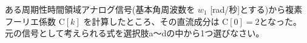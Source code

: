 ある周期性時間領域アナログ信号(基本角周波数を $w_1$ [rad/秒]とする)から複素フーリエ係数 $\textrm{C}[k]$ を計算したところ、その直流成分は $\textrm{C}[0] = 2$となった。
元の信号として考えられる式を選択肢a〜dの中から1つ選びなさい。
